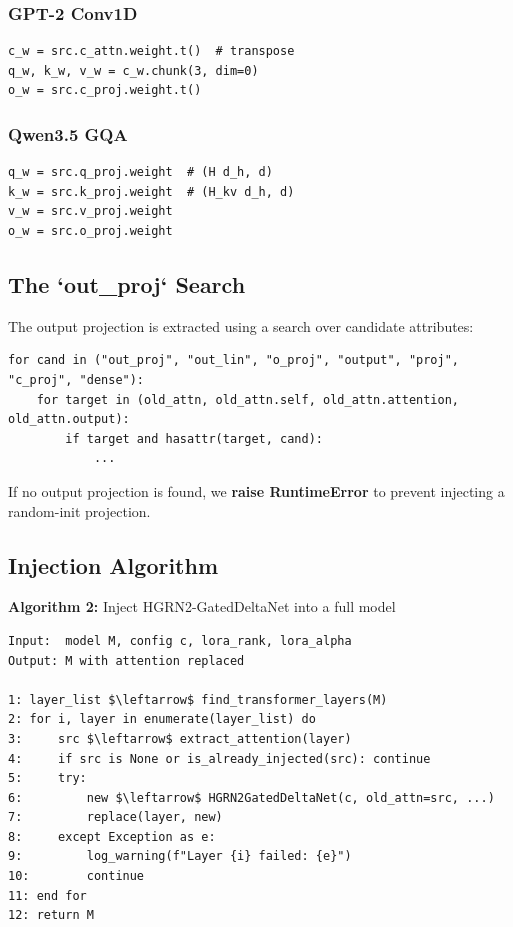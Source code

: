 \subsubsection{GPT-2 Conv1D}

\begin{lstlisting}
c_w = src.c_attn.weight.t()  # transpose
q_w, k_w, v_w = c_w.chunk(3, dim=0)
o_w = src.c_proj.weight.t()
\end{lstlisting}

\subsubsection{Qwen3.5 GQA}

\begin{lstlisting}
q_w = src.q_proj.weight  # (H d_h, d)
k_w = src.k_proj.weight  # (H_kv d_h, d)
v_w = src.v_proj.weight
o_w = src.o_proj.weight
\end{lstlisting}

\subsection{The `out\_proj` Search}

The output projection is extracted using a search over candidate attributes:

\begin{lstlisting}
for cand in ("out_proj", "out_lin", "o_proj", "output", "proj", "c_proj", "dense"):
    for target in (old_attn, old_attn.self, old_attn.attention, old_attn.output):
        if target and hasattr(target, cand):
            ...
\end{lstlisting}

If no output projection is found, we \textbf{raise RuntimeError} to prevent 
injecting a random-init projection.

\subsection{Injection Algorithm}

\textbf{Algorithm 2:} Inject HGRN2-GatedDeltaNet into a full model
\begin{lstlisting}
Input:  model M, config c, lora_rank, lora_alpha
Output: M with attention replaced

1: layer_list $\leftarrow$ find_transformer_layers(M)
2: for i, layer in enumerate(layer_list) do
3:     src $\leftarrow$ extract_attention(layer)
4:     if src is None or is_already_injected(src): continue
5:     try:
6:         new $\leftarrow$ HGRN2GatedDeltaNet(c, old_attn=src, ...)
7:         replace(layer, new)
8:     except Exception as e:
9:         log_warning(f"Layer {i} failed: {e}")
10:        continue
11: end for
12: return M
\end{lstlisting}


